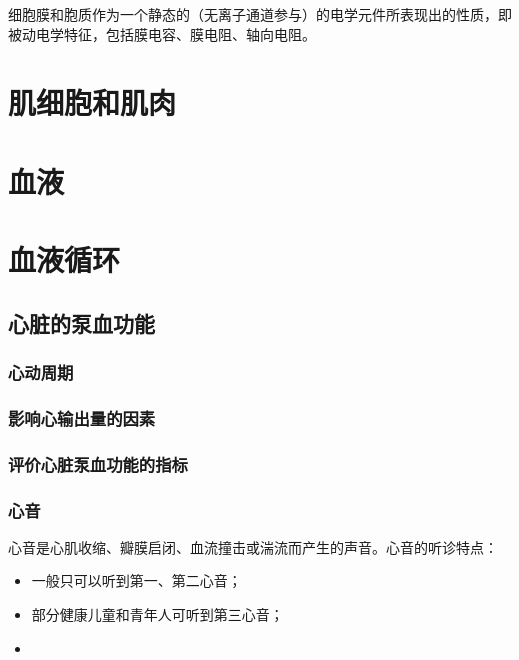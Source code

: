 细胞膜和胞质作为一个静态的（无离子通道参与）的电学元件所表现出的性质，即被动电学特征，包括膜电容、膜电阻、轴向电阻。





\section{肌细胞和肌肉}












\section{血液}

\section{血液循环}

\subsection{心脏的泵血功能}

\subsubsection{心动周期}

\subsubsection{影响心输出量的因素}

\subsubsection{评价心脏泵血功能的指标}

\subsubsection{心音}

心音是心肌收缩、瓣膜启闭、血流撞击或湍流而产生的声音。心音的听诊特点：

\begin{itemize}
	\item 一般只可以听到第一、第二心音；
	\item 部分健康儿童和青年人可听到第三心音；
	\item {}
\end{itemize}

